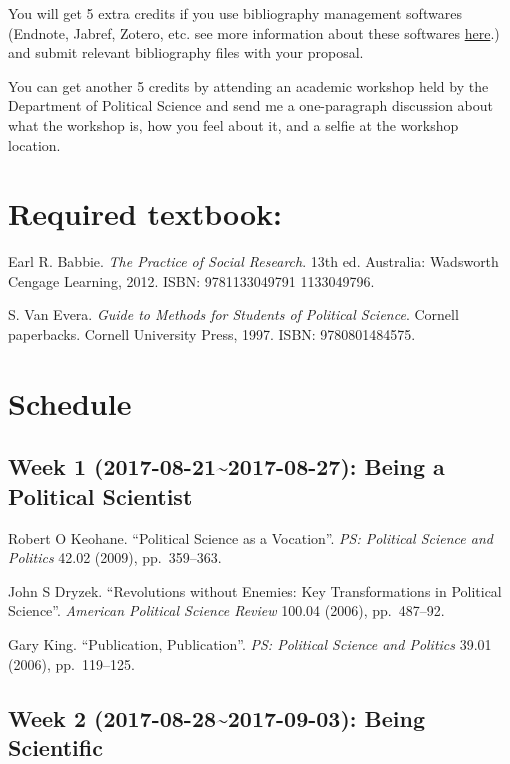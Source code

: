 \documentclass[11pt,]{article}
\theoremstyle{definition}
\theoremstyle{definition}
\theoremstyle{remark}
\begin{document}
You will get 5 extra credits if you use bibliography management
softwares (Endnote, Jabref, Zotero, etc. see more information about
these softwares
\href{https://en.wikipedia.org/wiki/Comparison_of_reference_management_software}{here}.)
and submit relevant bibliography files with your proposal.

You can get another 5 credits by attending an academic workshop held by
the Department of Political Science and send me a one-paragraph
discussion about what the workshop is, how you feel about it, and a
selfie at the workshop location.

\section{Required textbook:}\label{required-textbook}

Earl R. Babbie. \emph{The Practice of Social Research}. 13th ed.
Australia: Wadsworth Cengage Learning, 2012. ISBN: 9781133049791
1133049796.

S. Van Evera. \emph{Guide to Methods for Students of Political Science}.
Cornell paperbacks. Cornell University Press, 1997. ISBN: 9780801484575.

\section{Schedule}\label{schedule}

\subsection{Week 1 (2017-08-21\textasciitilde{}2017-08-27): Being a
Political
Scientist}\label{week-1-2017-08-212017-08-27-being-a-political-scientist}

Robert O Keohane. ``Political Science as a Vocation''.
\emph{PS: Political Science and Politics} 42.02 (2009), pp.~359--363.

John S Dryzek. ``Revolutions without Enemies: Key Transformations in
Political Science''. \emph{American Political Science Review} 100.04
(2006), pp.~487--92.

Gary King. ``Publication, Publication''.
\emph{PS: Political Science and Politics} 39.01 (2006), pp.~119--125.

\subsection{Week 2 (2017-08-28\textasciitilde{}2017-09-03): Being
Scientific}\label{week-2-2017-08-282017-09-03-being-scientific}
\end{document}
